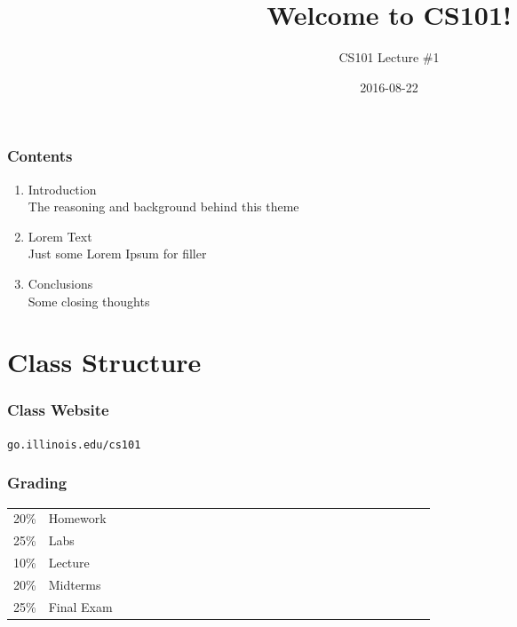 \documentclass{beamer}
\title{Welcome to CS101!}
\subtitle{}
\author{CS101 Lecture \#1}
\date{2016-08-22}
\begin{document}
  \setcounter{showProgressBar}{0}
  \setcounter{showSlideNumbers}{0}

\frame{\titlepage}

\begin{frame}
  \frametitle{Contents}
  \begin{enumerate}
    \item Introduction \\ \textcolor{CS101GradBot}{\footnotesize\hspace{1em} The reasoning and background behind this theme}
    \item Lorem Text  \\ \textcolor{CS101GradBot}{\footnotesize\hspace{1em} Just some Lorem Ipsum for filler}
    \item Conclusions \\ \textcolor{CS101GradBot}{\footnotesize\hspace{1em} Some closing thoughts}
  \end{enumerate}
\end{frame}

\setcounter{framenumber}{0}
\setcounter{showProgressBar}{1}
\setcounter{showSlideNumbers}{1}

\section{Class Structure}

\begin{frame}[plain,c]
  \frametitle{Class Website}
  \begin{center}
    \textcolor{CS101Base}{\Huge \texttt{go.illinois.edu/cs101}}
  \end{center}
\end{frame}

\begin{frame}
  \frametitle{Grading}
  \begin{tabular}{*{27}{l}}
    \toprule
    20\% & Homework \\
    25\% & Labs \\
    10\% & Lecture \\
    20\% & Midterms \\
    25\% & Final Exam \\
    \bottomrule
  \end{tabular}
\end{frame}
\end{document}
